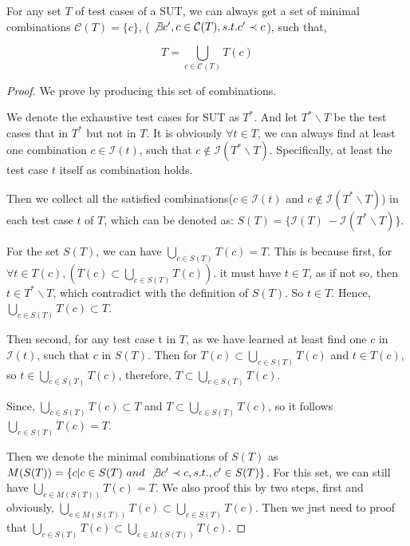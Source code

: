 \documentclass{sig-alternate}
\begin{document}

\begin{proposition}

For any set $T$ of test cases of a SUT, we can always get a set of minimal combinations $\mathcal{C}(T) = \{c \}$, ( $\not\exists c', c \in \mathcal{C}(T), s.t. c' \prec  c $),  such that,

\begin{displaymath} T  =  \bigcup_{c \in \mathcal{C}(T)} T(c) \end{displaymath}

\end{proposition}

\begin{proof}
We prove by producing this set of combinations.

We denote the exhaustive test cases for SUT as $T^{*}$. And let $T^{*} \backslash T$ be the test cases that in $T^{*}$ but not in $T$. It is obviously $\forall t \in T $, we can always find at least one combination $c \in \mathcal{I}(t)$, such that $c \not\in \mathcal{I}(T^{*} \backslash T)$. Specifically, at least the test case $t$ itself as combination holds.

Then we collect all the satisfied combinations($c \in \mathcal{I}(t)$  and $c \not\in \mathcal{I}(T^{*} \backslash T)$) in each test case $t$ of $T$, which can be denoted as:
$S(T) = \{ \mathcal{I}(T)\ - \mathcal{I}(T^{*} \backslash T) \}$.

For the set $S(T)$, we can have $ \bigcup_{c \in S(T)}T(c) = T$. This is because first, for $\forall t \in T(c), (T(c) \subset \bigcup_{c \in S(T)}T(c))$. it must have $t \in T$, as if not so, then $t \in T^{*} \backslash T$, which contradict with the definition of $S(T)$. So $t \in T$. Hence, $\bigcup_{c \in S(T)}T(c) \subset T$.

Then second, for any test case t in $T$, as we have learned at least find one $c$ in $\mathcal{I}(t)$, such that $c$ in $S(T)$. Then for $T(c) \subset \bigcup_{c \in S(T)} T(c)$ and $t \in T(c)$, so $t \in \bigcup_{c \in S(T)} T(c)$, therefore,  $ T \subset \bigcup_{c \in S(T)}T(c)$.

Since, $\bigcup_{c \in S(T)}T(c) \subset T$ and $ T \subset \bigcup_{c \in S(T)}T(c)$, so it follows $\bigcup_{c \in S(T)}T(c) = T$.

Then we denote the minimal combinations of $S(T)$ as $M(S(T)) = \{c | c \in S(T)\ and\ \not\exists c' \prec c, s.t., c' \in S(T)\}$. For this set, we can still have $ \bigcup_{c \in M(S(T))} T(c) = T$. We also proof this by two steps, first and obviously, $\bigcup_{c \in M(S(T))} T(c) \subset \bigcup_{c \in S(T)} T(c)$. Then we just need to proof that $\bigcup_{c \in S(T)} T(c) \subset \bigcup_{c \in M(S(T))} T(c)$.


\end{proof}
\end{document}
